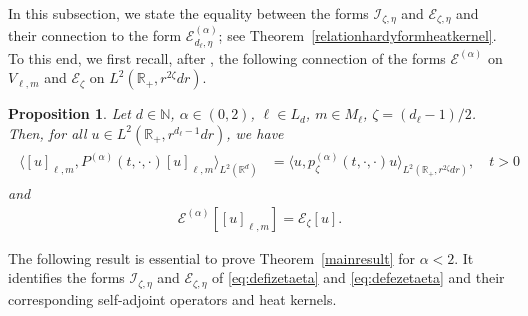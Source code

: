 \documentclass[12pt,reqno]{amsart}
\newtheorem{proposition}[theorem]{Proposition}
\theoremstyle{definition}
\theoremstyle{remark}
\numberwithin{equation}{section}
\newcommand{\1}{\mathbbm{1}}
\newcommand{\N}{\mathbb{N}}
\newcommand{\R}{\mathbb{R}}
\def\bs{\mathbb{S}}
\def\ce{\mathcal{E}}
\def\ci{\mathcal{I}}
\begin{document}
In this subsection, we state the equality between the forms $\ci_{\zeta,\eta}$ and $\ce_{\zeta,\eta}$ %
and their connection to the form $\ce_{d_\ell,\eta}^{(\alpha)}$; see Theorem~\ref{relationhardyformheatkernel}. To this end, we first recall, after \cite[Proposition~4.3]{BogdanMerz2024}, the following connection of the forms $\ce^{(\alpha)}$ on $V_{\ell,m}$ and $\ce_{\zeta}$ on $L^2(\R_+,r^{2\zeta}dr)$.

\begin{proposition}
  \label{relationformheatkernel}
  Let $d\in\N$, $\alpha\in(0,2)$, $\ell\in L_d$, $m\in M_\ell$, $\zeta=(d_\ell-1)/2$.
  Then, for all $u\in L^2(\R_+,r^{d_\ell-1}dr)$, we have
  \begin{align}
    \label{eq:linksemigroupsrdrplus}
    \begin{split}
      \langle[u]_{\ell,m},P^{(\alpha)}(t,\cdot,\cdot)[u]_{\ell,m}\rangle_{L^2(\R^d)}
      & = \langle u, p_\zeta^{(\alpha)}(t,\cdot,\cdot)u\rangle_{L^2(\R_+,r^{2\zeta}dr)},
        \quad t>0
    \end{split}
  \end{align}
  and
  \begin{align}
    \label{eq:relationformheatkernel3}
    \ce^{(\alpha)}[[u]_{\ell,m}] = \ce_{\zeta}[u].
  \end{align}
\end{proposition}

The following result is essential to prove Theorem~\ref{mainresult} for $\alpha<2$. It identifies the forms $\ci_{\zeta,\eta}$ and $\ce_{\zeta,\eta}$ of \eqref{eq:defizetaeta} and \eqref{eq:defezetaeta} and their corresponding self-adjoint operators and heat kernels.
\end{document}
